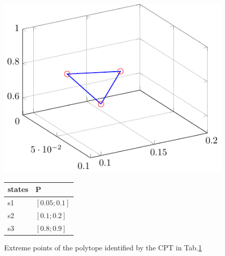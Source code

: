 \begin{figure}[H] 
    \centering
    \begin{minipage}{0.5\textwidth} 
        \centering
        \includegraphics[width=\linewidth]{imgs/pdfs/7_polytope.pdf}
        \caption{Extreme points of the polytope identified by the CPT in Tab.\ref{3_cpt_extremepoints}}\label{3_extreme_points}
    \end{minipage}
    \hfill
    \begin{minipage}{0.4\textwidth}
        \centering
        \begin{tabular}{P{1cm}P{1.5cm}}
            \toprule
            \textbf{states} & \textbf{P} \\
            \midrule
            s1 & $[0.05;0.1]$ \\
            s2 & $[0.1;0.2]$ \\
            s3 & $[0.8;0.9]$ \\
          \end{tabular}
        \label{3_cpt_extremepoints}
    \end{minipage}
\end{figure}

